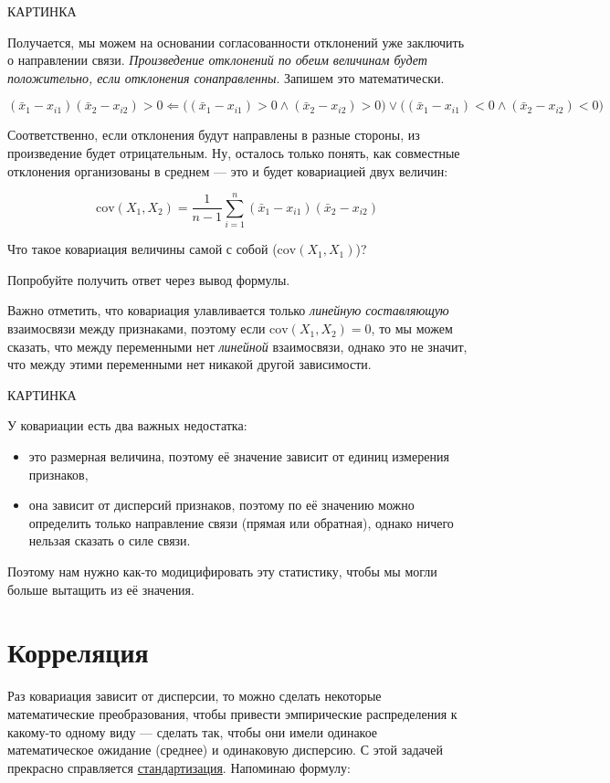 \documentclass[
  letterpaper,
  DIV=11,
  numbers=noendperiod]{scrreprt}
\providecommand{\tightlist}{%
  \setlength{\itemsep}{0pt}\setlength{\parskip}{0pt}}\usepackage{longtable,booktabs,array}
\theoremstyle{definition}
\theoremstyle{remark}
\begin{document}
КАРТИНКА

Получается, мы можем на основании согласованности отклонений уже
заключить о направлении связи. \emph{Произведение отклонений по обеим
величинам будет положительно, если отклонения сонаправленны}. Запишем
это математически.

\[
(\bar x_1 - x_{i1}) (\bar x_2 - x_{i2}) > 0 \Leftarrow \big( (\bar x_1 - x_{i1}) > 0 \wedge (\bar x_2 - x_{i2}) > 0 \big) \vee \big( (\bar x_1 - x_{i1}) < 0 \wedge (\bar x_2 - x_{i2}) < 0 \big)
\]

Соответственно, если отклонения будут направлены в разные стороны, из
произведение будет отрицательным. Ну, осталось только понять, как
совместные отклонения организованы в среднем --- это и будет ковариацией
двух величин:

\[
\mathrm{cov}(X_1, X_2) = \frac{1}{n-1} \sum_{i=1}^n (\bar x_1 - x_{i1}) (\bar x_2 - x_{i2})
\]

Что такое ковариация величины самой с собой
(\(\mathrm{cov}(X_1, X_1)\))?

Попробуйте получить ответ через вывод формулы.

Важно отметить, что ковариация улавливается только \emph{линейную
составляющую} взаимосвязи между признаками, поэтому если
\(\mathrm{cov}(X_1,X_2) = 0\), то мы можем сказать, что между
переменными нет \emph{линейной} взаимосвязи, однако это не значит, что
между этими переменными нет никакой другой зависимости.

КАРТИНКА

У ковариации есть два важных недостатка:

\begin{itemize}
\tightlist
\item
  это размерная величина, поэтому её значение зависит от единиц
  измерения признаков,
\item
  она зависит от дисперсий признаков, поэтому по её значению можно
  определить только направление связи (прямая или обратная), однако
  ничего нельзая сказать о силе связи.
\end{itemize}

Поэтому нам нужно как-то модицифировать эту статистику, чтобы мы могли
больше вытащить из её значения.

\section{Корреляция}\label{andan-corr-cor}

Раз ковариация зависит от дисперсии, то можно сделать некоторые
математические преобразования, чтобы привести эмпирические распределения
к какому-то одному виду --- сделать так, чтобы они имели одинакое
математическое ожидание (среднее) и одинаковую дисперсию. С этой задачей
прекрасно справляется \hyperref[standartization]{стандартизация}.
Напоминаю формулу:
\end{document}
